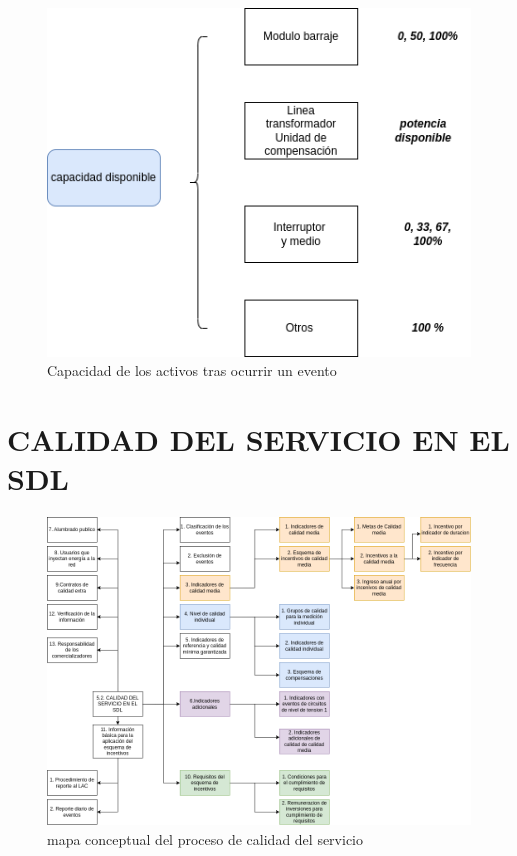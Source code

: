 \documentclass[a5paper]{book}%
\begin{document}
    \begin{figure}[H]
      \centering
      \caption[capacidad]{Capacidad de los activos tras ocurrir un evento}
      \label{fig:capacidad}
      \includegraphics[width=\linewidth]{capacidad_eventos}
    \end{figure}




    \section{CALIDAD DEL SERVICIO EN EL SDL}

    \begin{figure}[H]
  \centering
  \caption{mapa conceptual del proceso de calidad del servicio}
  \label{fig:esquema}
  \includegraphics[width=\linewidth]{mapa_calidad_sdl}
\end{figure}
\end{document}
